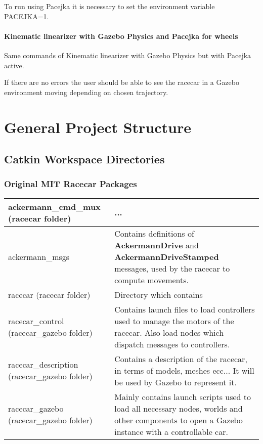 \documentclass[12pt, letterpaper]{report}
\begin{document}
To run using Pacejka it is necessary to set the environment variable PACEJKA=1.

\subsubsection{Kinematic linearizer with Gazebo Physics and Pacejka for wheels}

Same commands of Kinematic linearizer with Gazebo Physics but with Pacejka active.

If there are no errors the user should be able to see the racecar in a Gazebo environment moving depending on chosen trajectory.

\chapter{General Project Structure}

\section{Catkin Workspace Directories}

\subsection{Original MIT Racecar Packages}

\begin{center}
	\begin{tabularx}{\textwidth}{
			| >{\raggedright\arraybackslash}X
			| >{\arraybackslash}X |
		}
		\hline
		ackermann\_cmd\_mux (racecar folder) & ... \\
		\hline
		ackermann\_msgs & Contains definitions of \textbf{AckermannDrive} and \textbf{AckermannDriveStamped} messages, used by the racecar to compute movements. \\
		\hline
		racecar (racecar folder) & Directory which contains \\
		\hline
		racecar\_control (racecar\_gazebo folder) & Contains launch files to load controllers used to manage the motors of the racecar. Also load nodes which dispatch messages to controllers. \\
		\hline
		racecar\_description (racecar\_gazebo folder) & Contains a description of the racecar, in terms of models, meshes ecc... It will be used by Gazebo to represent it. \\
		\hline
		racecar\_gazebo (racecar\_gazebo folder) & Mainly contains launch scripts used to load all necessary nodes, worlds and other components to open a Gazebo instance with a controllable car. \\
		\hline
	\end{tabularx}
\end{center}
\end{document}
